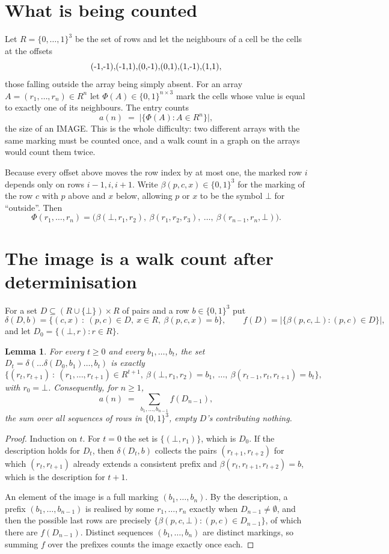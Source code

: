 \documentclass[11pt,a4paper]{article}
\theoremstyle{plain}
\newtheorem{lemma}[theorem]{Lemma}
\theoremstyle{definition}
\begin{document}
\section{What is being counted}

Let $R=\{0,\dots,1\}^{3}$ be the set of rows and let the neighbours of a cell be the
cells at the offsets
\[
$(-1,-1)$, $(-1,1)$, $(0,-1)$, $(0,1)$, $(1,-1)$, $(1,1)$,
\]
those falling outside the array being simply absent. For an array
$A=(r_1,\dots,r_n)\in R^n$ let $\Phi(A)\in\{0,1\}^{n\times3}$ mark the cells whose value
is equal to exactly one of its neighbours. The entry counts
\[
a(n)\;=\;\bigl|\{\Phi(A):A\in R^n\}\bigr| ,
\]
the size of an IMAGE. This is the whole difficulty: two different arrays with the same marking
must be counted once, and a walk count in a graph on the arrays would count them twice.

Because every offset above moves the row index by at most one, the marked row $i$ depends only
on rows $i-1,i,i+1$. Write $\beta(p,c,x)\in\{0,1\}^{3}$ for the marking of the row $c$
with $p$ above and $x$ below, allowing $p$ or $x$ to be the symbol $\bot$ for ``outside''.
Then
\[
\Phi(r_1,\dots,r_n)=\bigl(\beta(\bot,r_1,r_2),\ \beta(r_1,r_2,r_3),\ \dots,\
\beta(r_{n-1},r_n,\bot)\bigr).
\]

\section{The image is a walk count after determinisation}

For a set $D\subseteq(R\cup\{\bot\})\times R$ of pairs and a row $b\in\{0,1\}^{3}$ put
\[
\delta(D,b)=\{(c,x)\ :\ (p,c)\in D,\ x\in R,\ \beta(p,c,x)=b\},\qquad
f(D)=\bigl|\{\beta(p,c,\bot):(p,c)\in D\}\bigr| ,
\]
and let $D_0=\{(\bot,r):r\in R\}$.

\begin{lemma}\label{lem:det}
For every $t\ge0$ and every $b_1,\dots,b_t$, the set
$D_t=\delta(\dots\delta(D_0,b_1)\dots,b_t)$ is exactly
\[
\{(r_t,r_{t+1})\ :\ (r_1,\dots,r_{t+1})\in R^{t+1},\ \beta(\bot,r_1,r_2)=b_1,\ \dots,\
\beta(r_{t-1},r_t,r_{t+1})=b_t\} ,
\]
with $r_0=\bot$. Consequently, for $n\ge1$,
\[
a(n)\;=\;\sum_{b_1,\dots,b_{n-1}}f(D_{n-1}),
\]
the sum over all sequences of rows in $\{0,1\}^{3}$, empty $D$'s contributing nothing.
\end{lemma}

\begin{proof}
Induction on $t$. For $t=0$ the set is $\{(\bot,r_1)\}$, which is $D_0$. If the description
holds for $D_t$, then $\delta(D_t,b)$ collects the pairs $(r_{t+1},r_{t+2})$ for which
$(r_t,r_{t+1})$ already extends a consistent prefix and
$\beta(r_t,r_{t+1},r_{t+2})=b$, which is the description for $t+1$.

An element of the image is a full marking $(b_1,\dots,b_n)$. By the description, a prefix
$(b_1,\dots,b_{n-1})$ is realised by some $r_1,\dots,r_n$ exactly when $D_{n-1}\neq
\emptyset$, and then the possible last rows are precisely
$\{\beta(p,c,\bot):(p,c)\in D_{n-1}\}$, of which there are $f(D_{n-1})$. Distinct
sequences $(b_1,\dots,b_n)$ are distinct markings, so summing $f$ over the prefixes counts the
image exactly once each.
\end{proof}
\end{document}
